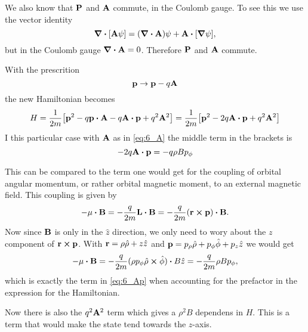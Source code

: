 \documentclass[11pt,letter, swedish, english
]{article}
\begin{document}
We also know that $\vb{P}$ and $\vb{A}$ commute, in the Coulomb
gauge. To see this we use the vector identity
\begin{equation}
\div[\vb{A}\psi]=(\div\vb{A})\psi + \vb{A}\vdot[\grad\psi],
\end{equation}
but in the Coulomb gauge $\div\vb{A}=0$. Therefore $\vb{P}$ and
$\vb{A}$ commute. 

With the prescrition
\begin{equation}
\vb{p}\to \vb{p}-q\vb{A}
\end{equation}
the new Hamiltonian becomes
\begin{equation}
H=\frac{1}{2m}\qty[\vb{p}^2-q\vb{p}\vdot\vb{A}-q\vb{A}\vdot\vb{p}+q^2\vb{A}^2]
=\frac{1}{2m}\qty[\vb{p}^2-2q\vb{A}\vdot\vb{p}+q^2\vb{A}^2]
\end{equation}
I this particular case with $\vb{A}$ as in \eqref{eq:6_A} the middle
term in the brackets is
\begin{equation}
-2q\vb{A}\vdot\vb{p}=-q\rho B p_\phi
\end{equation}


This can be compared to the term one would get for the coupling
of orbital angular momentum, or rather orbital magnetic moment,
to an external magnetic field. This coupling is given by
\begin{equation}\label{eq:6_Ap}
-\vb{\mu}\vdot\vb{B}=-\frac{q}{2m}\vb{L}\vdot\vb{B}
=-\frac{q}{2m}(\vb{r}\cross\vb{p})\vdot\vb{B}.
\end{equation}
Now since $\vb{B}$ is only in the $\hat{z}$ direction, we
only need to wory about the $z$ component of
$\vb{r}\cross\vb{p}$. With $\vb{r}=\rho\hat\rho+z\hat{z}$ and
$\vb{p}=p_\rho\hat\rho + p_\phi\hat\phi+p_z\hat{z}$ we would get
\begin{equation}
-\vb{\mu}\vdot\vb{B}
=-\frac{q}{2m}(\rho p_\phi \hat\rho\cross\hat\phi)\vdot B\hat{z}
=-\frac{q}{2m}\rho B p_\phi,
\end{equation}
which is exactly the term in \eqref{eq:6_Ap} when accounting for the
prefactor in the expression for the Hamiltonian.

Now there is also the $q^2\vb{A}^2$ term which gives a $\rho^2B$
dependens in $H$. This is a term that would make the state tend
towards the $z$-axis. 
\end{document}
